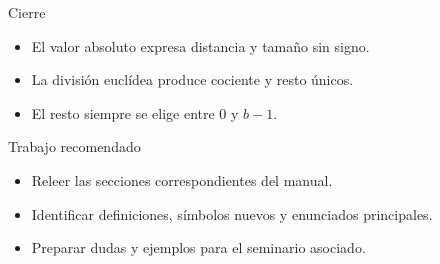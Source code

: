 \documentclass[aspectratio=169,11pt]{beamer}
\begin{document}
\begin{frame}{Cierre}
\begin{itemize}
  \item El valor absoluto expresa distancia y tamaño sin signo.
  \item La división euclídea produce cociente y resto únicos.
  \item El resto siempre se elige entre \(0\) y \(b-1\).
\end{itemize}
\end{frame}

\begin{frame}{Trabajo recomendado}
\begin{itemize}
  \item Releer las secciones correspondientes del manual.
  \item Identificar definiciones, símbolos nuevos y enunciados principales.
  \item Preparar dudas y ejemplos para el seminario asociado.
\end{itemize}
\end{frame}
\end{document}
